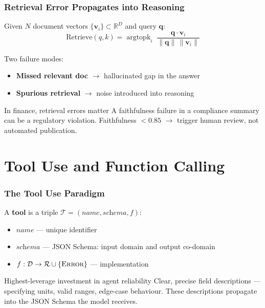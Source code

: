 \documentclass[9pt,t]{beamer}
\begin{document}
\begin{frame}
\frametitle{Retrieval Error Propagates into Reasoning}

Given $N$ document vectors $\{\mathbf{v}_i\} \subset \mathbb{R}^D$ and query $\mathbf{q}$:
\[
  \text{Retrieve}(q,k) = \operatorname{argtopk}_{i}\;
  \frac{\mathbf{q} \cdot \mathbf{v}_i}{\|\mathbf{q}\|\,\|\mathbf{v}_i\|}
\]

\medskip
Two failure modes:
\begin{itemize}
  \item \textbf{Missed relevant doc} $\to$ hallucinated gap in the answer
  \item \textbf{Spurious retrieval} $\to$ noise introduced into reasoning
\end{itemize}

\medskip
\begin{alertblock}{In finance, retrieval errors matter}
A faithfulness failure in a compliance summary can be a regulatory violation.
Faithfulness $< 0.85$ $\to$ trigger human review, not automated publication.
\end{alertblock}
\end{frame}

\section{Tool Use and Function Calling}

\begin{frame}
\frametitle{The Tool Use Paradigm}

A \textbf{tool} is a triple $\mathcal{T} = (\textit{name}, \textit{schema}, f)$:
\begin{itemize}
  \item $\textit{name}$ --- unique identifier
  \item $\textit{schema}$ --- JSON Schema: input domain and output co-domain
  \item $f: \mathcal{D} \to \mathcal{R} \cup \{\textsc{Error}\}$ --- implementation
\end{itemize}

\medskip
\begin{block}{Highest-leverage investment in agent reliability}
Clear, precise field descriptions --- specifying units, valid ranges, edge-case behaviour.
These descriptions propagate into the JSON Schema the model receives.
\end{block}
\end{frame}
\end{document}
